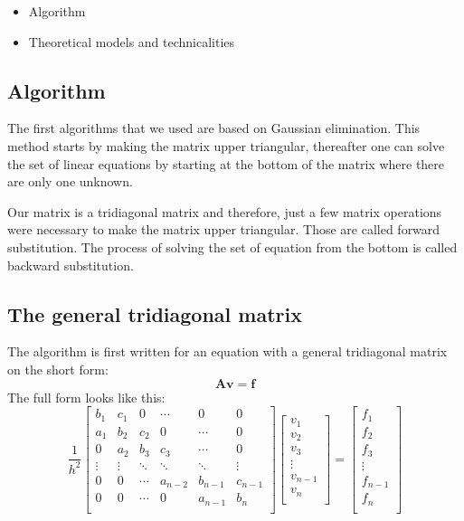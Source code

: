 \begin{itemize}

\item Algorithm

\item Theoretical models and technicalities

\end{itemize}

\subsection{Algorithm}

The first algorithms that we used are based on Gaussian elimination. This method starts by making the matrix upper triangular, thereafter one can solve the set of linear equations by starting at the bottom of the matrix where there are only one unknown. 

Our matrix is a tridiagonal matrix and therefore, just a few matrix operations were necessary to make the matrix upper triangular. Those are called forward substitution. The process of solving the set of equation from the bottom is called backward substitution.

\subsection{The general tridiagonal matrix}
The algorithm is first written for an equation with a general tridiagonal matrix on the short form:
\[
\mathbf{A}\mathbf{v}=\mathbf{f}
\]
The full form looks like this:
\[ \frac{1}{h^2}
    \begin{bmatrix}
    	b_1& c_1& 0 &\cdots & 0 &0 \\
        a_1 & b_2 & c_2 &0 &\cdots &0 \\
        0&a_2 &b_3 & c_3 & \cdots & 0 \\
        \vdots& \vdots & \ddots &\ddots &\ddots & \vdots \\
        0&0 & \cdots &a_{n-2} &b_{n-1}& c_{n-1} \\
        0&0 & \cdots & 0  &a_{n-1} & b_n \\
        \end{bmatrix}
\begin{bmatrix}
	v_1\\
	v_2\\
	v_3\\
	\vdots\\
	v_{n-1}\\
	v_{n}\\
\end{bmatrix}=
\begin{bmatrix}
	f_1\\
	f_2\\
	f_3\\
	\vdots\\
	f_{n-1}\\
	f_{n}\\
\end{bmatrix}
\]

